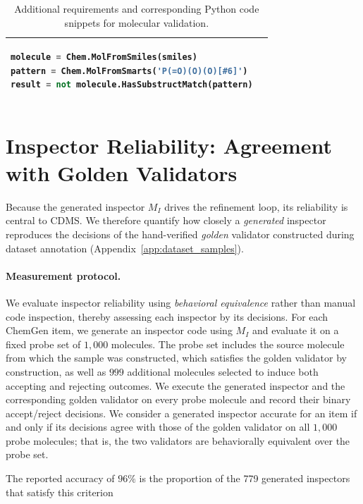 \documentclass[10pt]{article} %
\begin{document}
\begin{table}
\begin{tabular}{|p{}|p{}|}
\begin{lstlisting}[language=Python]
molecule = Chem.MolFromSmiles(smiles)
pattern = Chem.MolFromSmarts('P(=O)(O)(O)[#6]')
result = not molecule.HasSubstructMatch(pattern)
            \end{lstlisting} \\
            \hline

        \end{tabular}
        \caption{Additional requirements and corresponding Python code snippets for molecular validation.}
        \label{tab:additional_requirements}
    \end{table}


    \section{Inspector Reliability: Agreement with Golden Validators}
    \label{app:inspector_reliability}

    Because the generated inspector $M_I$ drives the refinement loop, its reliability is central to CDMS. We therefore quantify how closely a \emph{generated} inspector reproduces the decisions of the hand-verified \emph{golden} validator constructed during dataset annotation (Appendix~\ref{app:dataset_samples}).

    \paragraph{Measurement protocol.}
    We evaluate inspector reliability using \emph{behavioral equivalence} rather than manual code inspection, thereby assessing each inspector by its decisions. For each ChemGen item, we generate an inspector code using $M_I$ and evaluate it on a fixed probe set of $1{,}000$ molecules. The probe set includes the source molecule from which the sample was constructed, which satisfies the golden validator by construction, as well as $999$ additional molecules selected to induce both accepting and rejecting outcomes. We execute the generated inspector and the corresponding golden validator on every probe molecule and record their binary accept/reject decisions. We consider a generated inspector accurate for an item if and only if its decisions agree with those of the golden validator on all $1{,}000$ probe molecules; that is, the two validators are behaviorally equivalent over the probe set. 
    
    The reported accuracy of $96\%$ is the proportion of the 779 generated inspectors that satisfy this criterion
\end{document}
